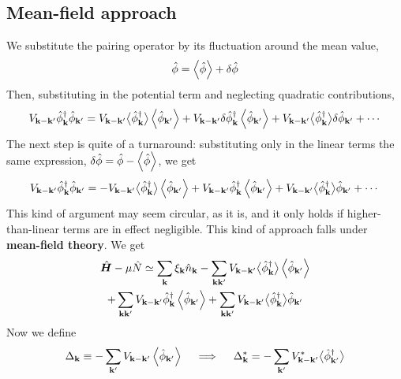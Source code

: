 \subsection{Mean-field approach}
We substitute the pairing operator by its fluctuation around the mean value,
\[
	\hat{\phi} = \ev{\hat{\phi}} + \delta\hat{\phi}
\]
Then, substituting in the potential term and neglecting quadratic contributions,
\[
	V_{\mathbf{k}-\mathbf{k}'} \hat{\phi}_\mathbf{k}^\dagger \hat{\phi}_{\mathbf{k}'} = V_{\mathbf{k}-\mathbf{k}'}  \big\langle\hat{\phi}_\mathbf{k}^\dagger\big\rangle \ev{\hat{\phi}_{\mathbf{k}'}}
	+ V_{\mathbf{k}-\mathbf{k}'} \delta\hat{\phi}_\mathbf{k}^\dagger \ev{\hat{\phi}_{\mathbf{k}'}}
	+ V_{\mathbf{k}-\mathbf{k}'} \big\langle\hat{\phi}_\mathbf{k}^\dagger\big\rangle \delta\hat{\phi}_{\mathbf{k}'}
	+ \cdots
\]
The next step is quite of a turnaround: substituting only in the linear terms the same expression, $\delta\hat{\phi} = \hat{\phi}-\ev{\hat{\phi}}$, we get
\[
	V_{\mathbf{k}-\mathbf{k}'} \hat{\phi}_\mathbf{k}^\dagger \hat{\phi}_{\mathbf{k}'} = - V_{\mathbf{k}-\mathbf{k}'}  \big\langle\hat{\phi}_\mathbf{k}^\dagger\big\rangle \ev{\hat{\phi}_{\mathbf{k}'}}
	+ V_{\mathbf{k}-\mathbf{k}'} \hat{\phi}_\mathbf{k}^\dagger \ev{\hat{\phi}_{\mathbf{k}'}}
	+ V_{\mathbf{k}-\mathbf{k}'} \big\langle\hat{\phi}_\mathbf{k}^\dagger\big\rangle\hat{\phi}_{\mathbf{k}'}
	+ \cdots
\]
This kind of argument may seem circular, as it is, and it only holds if higher-than-linear terms are in effect negligible. This kind of approach falls under \textbf{mean-field theory}. We get
\begin{multline*}
	\hat{\bm H} - \mu\hat{N} \simeq \sum_{\mathbf{k}} \xi_{\mathbf{k}} \hat n_\mathbf{k} - \sum_{\mathbf{k}\mathbf{k}'} V_{\mathbf{k}-\mathbf{k}'}  \big\langle\hat{\phi}_\mathbf{k}^\dagger \big\rangle \ev{\hat{\phi}_{\mathbf{k}'}} \\
	+ \sum_{\mathbf{k}\mathbf{k}'} V_{\mathbf{k}-\mathbf{k}'} \hat{\phi}_\mathbf{k}^\dagger \ev{\hat{\phi}_{\mathbf{k}'}} + \sum_{\mathbf{k}\mathbf{k}'} V_{\mathbf{k}-\mathbf{k}'}  \big\langle\hat{\phi}_\mathbf{k}^\dagger \big\rangle \hat{\phi}_{\mathbf{k}'}
\end{multline*}
Now we define
\begin{equation}\label{eq:delta mean field definition}
	\Delta_\mathbf{k} \equiv - \sum_{\mathbf{k}'} V_{\mathbf{k}-\mathbf{k}'} \ev{\hat{\phi}_{\mathbf{k}'}}
	\quad\implies\quad
	\Delta_\mathbf{k}^* = - \sum_{\mathbf{k}'} V_{\mathbf{k}-\mathbf{k}'}^* \big\langle\hat{\phi}_{\mathbf{k}'}^\dagger\big\rangle
\end{equation}
